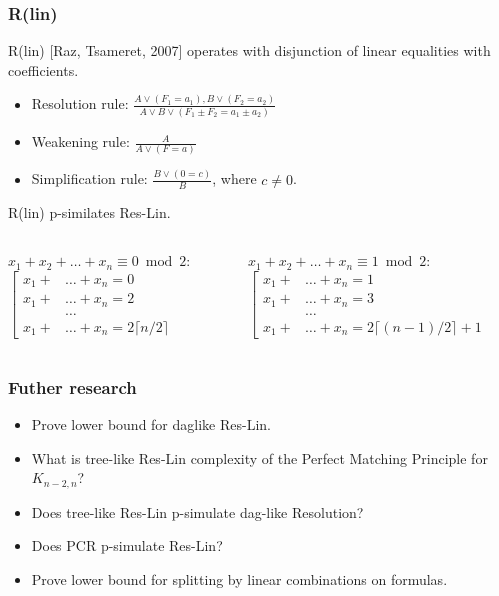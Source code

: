 \begin{frame}
    \frametitle{R(lin)}

    R(lin) [Raz, Tsameret, 2007] operates with disjunction of linear equalities with
     coefficients.
    
	\begin{itemize}
		\item Resolution rule: $\frac{A \lor (F_1 = a_1), B \lor (F_2 = a_2)}
    		{A \lor B \lor (F_1 \pm F_2 = a_1 \pm a_2)}$
		\item Weakening rule: $\frac{A}{A \lor (F = a)}$
		\item Simplification rule: $\frac{B \lor (0 = c)}{B}$, where $c \neq 0$. 
	\end{itemize}

	\pause
    \begin{theorem}
    	R(lin) p-similates Res-Lin.    
    \end{theorem}
    
	\medskip

	\pause
	\begin{columns}
		\begin{column}{5cm}
			$x_1 + x_2 + \dots + x_n \equiv 0 \bmod 2$:
			$\left[\begin{aligned}
            	x_1 + &\dots + x_n = 0\\
                x_1 + &\dots + x_n = 2\\
                &\dots \\
                x_1 + &\dots + x_n = 2 \lceil n / 2 \rceil
            \end{aligned}\right.$ 
		\end{column}
		\begin{column}{5cm}
			$x_1 + x_2 + \dots + x_n \equiv 1 \bmod 2$:
			$\left[\begin{aligned}
                x_1 + &\dots + x_n = 1\\
                x_1 + &\dots + x_n = 3\\
                &\dots \\
                x_1 + &\dots + x_n = 2 \lceil (n - 1) / 2 \rceil + 1
            \end{aligned}\right.$
		\end{column}
	\end{columns}
\end{frame}


\begin{frame}
    \frametitle{Futher research}

    \begin{itemize}
		\item Prove lower bound for daglike Res-Lin.
		\item What is tree-like Res-Lin complexity of the Perfect Matching Principle
		    for $K_{n - 2, n}$? 
		\item Does tree-like Res-Lin p-simulate dag-like Resolution?
		\item Does PCR p-simulate Res-Lin?
		\item Prove lower bound for splitting by linear combinations on
		     formulas.
	\end{itemize}
\end{frame}


